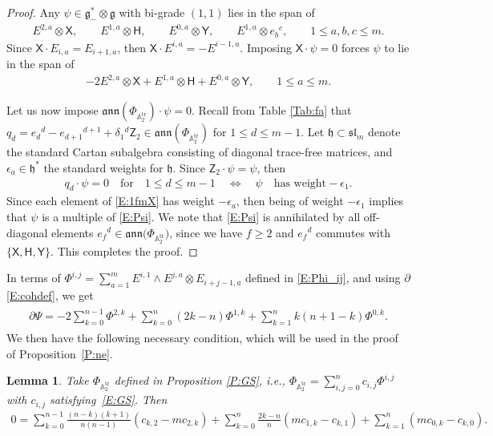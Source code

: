 \documentclass[pdftex]{sigma}%
\newcommand\tensor{\otimes}
\DeclareMathOperator{\tr}{tr}
\newcommand{\fh}{\mathfrak{h}}
\newcommand\fann{\mathfrak{ann}}
\newcommand\fg{\mathfrak{g}}
\newcommand\fsl{\mathfrak{sl}}
\newcommand\bbA{\mathbb{A}}
\newcommand\sfX{\mathsf{X}}
\newcommand\sfH{\mathsf{H}}
\newcommand\sfY{\mathsf{Y}}
\newcommand\sfZ{\mathsf{Z}}
\numberwithin{equation}{section}
\newtheorem{Lemma}[Theorem]{Lemma}
\begin{document}
\begin{proof}
 Any $\psi \in \fg_-^* \otimes \fg$ with bi-grade $(1,1)$ lies in the span of
\begin{align*}%
E^{2,a} \tensor \sfX, \qquad E^{1,a} \tensor \sfH,\qquad E^{0,a} \tensor \sfY, \qquad E^{1,a} \tensor e_b{}^c, \qquad 1 \le a,b,c \le m.
\end{align*}
Since $\sfX \cdot E_{i,a} = E_{i+1,a}$, then $\sfX \cdot E^{i,a} = -E^{i-1,a}$. Imposing $\sfX \cdot \psi = 0$ forces $\psi$ to lie in the span of
\begin{align} \label{E:1fmX}
-2 E^{2,a} \tensor \sfX + E^{1,a} \tensor \sfH + E^{0,a} \tensor \sfY, \qquad 1 \le a \le m.
\end{align}
	
Let us now impose $\fann(\Phi_{\bbA_2^{\tr}}) \cdot \psi = 0$. Recall from Table \ref{Tab:fa} that $q_d = e_d{}^d-e_{d+1}{}^{d+1} + \delta_1{}^d\sfZ_2 \in \fann(\Phi_{\bbA_2^{\tr}})$ for $1 \le d \le m-1$. Let $\fh \subset \fsl_m$ denote the standard Cartan subalgebra consisting of diagonal trace-free matrices, and $\epsilon_a \in \fh^*$ the standard weights for $\fh$. Since $\sfZ_2 \cdot \psi = \psi$, then
\begin{align*}
q_d \cdot \psi = 0 \quad \text{for}\quad 1 \le d \leq m-1 \quad\iff\quad \psi \quad \text{has weight} -\epsilon_1.
\end{align*}
Since each element of \eqref{E:1fmX} has weight $-\epsilon_a$, then being of weight $-\epsilon_1$ implies that $\psi$ is a multiple of \eqref{E:Psi}.	
We note that \eqref{E:Psi} is annihilated by all off-diagonal elements $e_f{}^d \in \fann\bigl(\Phi_{\bbA_2^{\tr}}\bigr)$, since we have $f \ge 2$ and $e_f{}^d$ commutes with $\{\sfX, \sfH, \sfY \}$. This completes the proof.
\end{proof}

 In terms of $\Phi^{i,j}= \sum_{a=1}^m E^{i,1} \wedge E^{j,a} \tensor E_{i+j-1,a}$ defined in \eqref{E:Phi_ij}, and using $\partial$ \eqref{E:cohdef}, we get
\begin{align} \label{E:dPsi}
\begin{split}
\partial \Psi = -2 \sum_{k=0}^{n-1} \Phi^{2,k} + \sum_{k=0}^n (2k-n) \Phi^{1,k} + \sum_{k=1}^n k(n+1-k)\Phi^{0,k}.
\end{split}
\end{align}
We then have the following necessary condition, which will be used in the proof of Proposition~\ref{P:ne}.
\begin{Lemma}\label{L:norm}
Take $\Phi_{\bbA_2^{\tr}}$ defined in Proposition {\rm \ref{P:GS}}, i.e., $\Phi_{\bbA_2^{\tr}} = \sum_{i,j=0}^nc_{i,j}\Phi^{i,j}$ with $c_{i,j}$ satisfying~\eqref{E:GS}. Then
\begin{align*}%
0 = \sum_{k=0}^{n-1} \frac{(n-k)(k+1)}{n(n-1)}(c_{k,2}-mc_{2,k})
+ \sum_{k=0}^{n} \frac{2k-n}{n} (mc_{1,k}-c_{k,1}) + \sum_{k=1}^n (mc_{0,k}-c_{k,0}).
\end{align*}
\end{Lemma}
\end{document}
